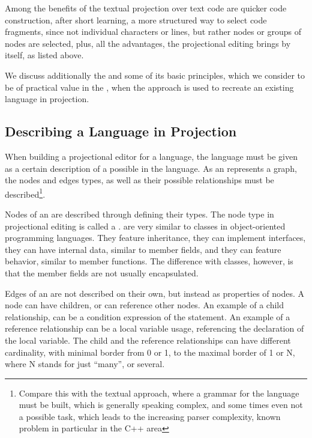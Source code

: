 Among the benefits of the textual projection over text code are quicker code construction, 
after short learning, a more structured way to select code fragments, since not individual 
characters or lines, but rather  nodes or groups of nodes are selected, 
plus, all the advantages, the projectional editing brings by itself, as listed above.

We discuss additionally the  and some of its basic 
principles, which we consider to be of practical value in the ,
when the approach is used to recreate an existing language in projection.


\subsection{Describing a Language in Projection}
\label{langaspects}

When  building a projectional editor for a language, the language must be given as a certain description of a possible  in the language.
As an  represents a graph, the nodes and edges types, as well as their possible relationships must be described\footnote{Compare this
with the textual approach, where a grammar for the language must be built, which is generally speaking complex, and some times even not a
possible task, which leads to the increasing parser complexity, known problem in particular in the C++ area}. 

Nodes of an  are described through defining their types. The node type in projectional editing is called a .  are very
similar to classes in object-oriented programming languages. They feature inheritance, they can implement interfaces, they can have internal data, similar
to member fields, and they can feature behavior, similar to member functions. The difference with classes, however, is that the member fields are not 
usually encapsulated.

Edges of an  are not described on their own, but instead as properties of nodes. A node can have children, or can reference other nodes.
An example of a child relationship, can be a condition expression of the  statement. An example of a reference relationship can be a 
local variable usage, referencing the declaration of the local variable. 
The child and the reference relationships can have different cardinality, with minimal border from 0 or 1, to the 
maximal border of 1 or N, where N stands for just ``many'', or several.

